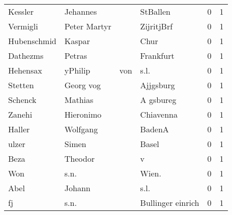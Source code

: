 \begin{center}
\begin{tiny}
\begin{longtabu}{llllrr}
                  Kessler &                           Jehannes &             &                                    StBallen &          0 &         1 \\
                 Vermigli &                       Peter Martyr &             &                                  ZijritjBrf &          0 &         1 \\
              Hubenschmid &                             Kaspar &             &                                        Chur &          0 &         1 \\
                 Dathezms &                             Petras &             &                                   Frankfurt &          0 &         1 \\
                 Hehensax &                            yPhilip &         von &                                        s.l. &          0 &         1 \\
                  Stetten &                          Georg vog &             &                                   Ajjgsburg &          0 &         1 \\
                  Schenck &                            Mathias &             &                                   A gsbureg &          0 &         1 \\
                   Zanehi &                          Hieronimo &             &                                   Chiavenna &          0 &         1 \\
                   Haller &                           Wolfgang &             &                                      BadenA &          0 &         1 \\
                    ulzer &                              Simen &             &                                       Basel &          0 &         1 \\
                     Beza &                            Theodor &             &                                           v &          0 &         1 \\
                      Won &                               s.n. &             &                                      Wien.  &          0 &         1 \\
                     Abel &                             Johann &             &                                        s.l. &          0 &         1 \\
                       fj &                               s.n. &             &                           Bullinger einrich &          0 &         1 \\

\end{longtabu}
\end{tiny}
\end{center}
